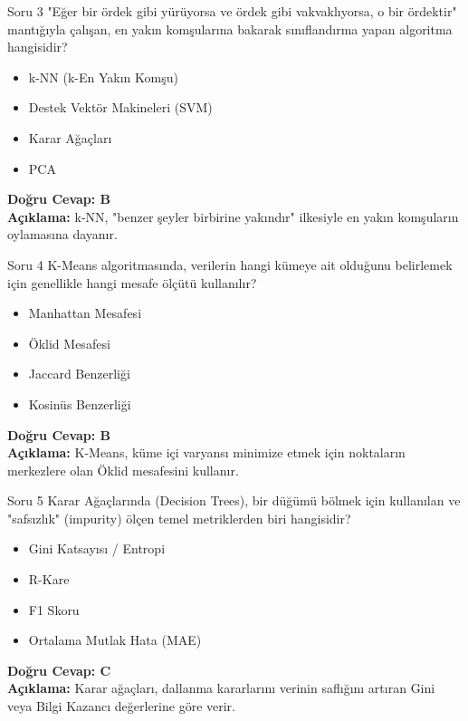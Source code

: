 \documentclass[12pt,a4paper]{article}
\begin{document}
\begin{testcard}{Soru 3}
    "Eğer bir ördek gibi yürüyorsa ve ördek gibi vakvaklıyorsa, o bir ördektir" mantığıyla çalışan, en yakın komşularına bakarak sınıflandırma yapan algoritma hangisidir?
    \begin{itemize}
        \item[A)] k-NN (k-En Yakın Komşu)
        \item[B)] Destek Vektör Makineleri (SVM)
        \item[C)] Karar Ağaçları
        \item[D)] PCA
    \end{itemize}
    \tcblower
    \textbf{Doğru Cevap: B} \\
    \textbf{Açıklama:} k-NN, "benzer şeyler birbirine yakındır" ilkesiyle en yakın komşuların oylamasına dayanır.
\end{testcard}

\begin{testcard}{Soru 4}
    K-Means algoritmasında, verilerin hangi kümeye ait olduğunu belirlemek için genellikle hangi mesafe ölçütü kullanılır?
    \begin{itemize}
        \item[A)] Manhattan Mesafesi
        \item[B)] Öklid Mesafesi
        \item[C)] Jaccard Benzerliği
        \item[D)] Kosinüs Benzerliği
    \end{itemize}
    \tcblower
    \textbf{Doğru Cevap: B} \\
    \textbf{Açıklama:} K-Means, küme içi varyansı minimize etmek için noktaların merkezlere olan Öklid mesafesini kullanır.
\end{testcard}

\begin{testcard}{Soru 5}
    Karar Ağaçlarında (Decision Trees), bir düğümü bölmek için kullanılan ve "safsızlık" (impurity) ölçen temel metriklerden biri hangisidir?
    \begin{itemize}
        \item[A)] Gini Katsayısı / Entropi
        \item[B)] R-Kare
        \item[C)] F1 Skoru
        \item[D)] Ortalama Mutlak Hata (MAE)
    \end{itemize}
    \tcblower
    \textbf{Doğru Cevap: C} \\
    \textbf{Açıklama:} Karar ağaçları, dallanma kararlarını verinin saflığını artıran Gini veya Bilgi Kazancı değerlerine göre verir.
\end{testcard}
\end{document}
